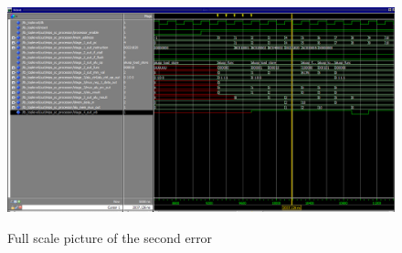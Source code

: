 \begin{figure}[h]
	\caption{Full scale picture of the second error}
	\includegraphics[scale=0.55, angle=90]{figures/lw_WORKING_WB_writing_garbage_to_zero_reg.PNG}
	\label{fig:error-2-landscape}
\end{figure}
